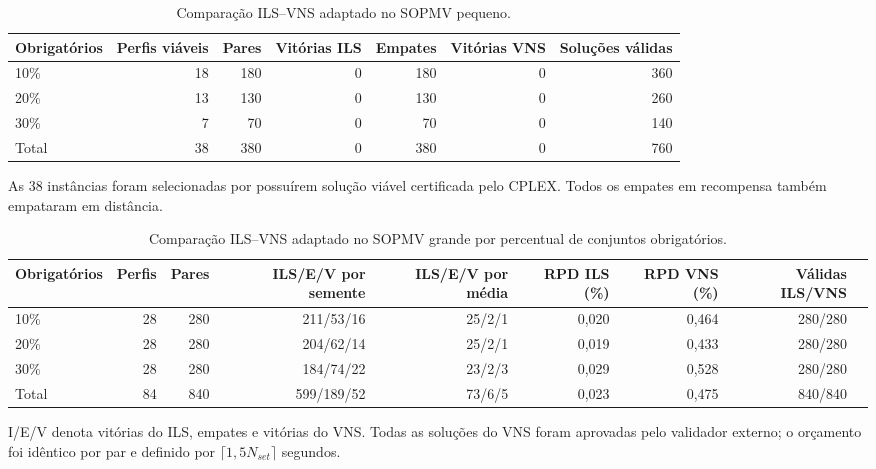 \begin{table}[htbp]
\centering
\caption{Comparação ILS--VNS adaptado no SOPMV pequeno.}
\label{tab:ils-vns-sopmv-small-summary}
\begin{tabular}{lrrrrrr}
\toprule
Obrigatórios & Perfis viáveis & Pares & Vitórias ILS & Empates & Vitórias VNS & Soluções válidas \\
\midrule
10\% & 18 & 180 & 0 & 180 & 0 & 360 \\
20\% & 13 & 130 & 0 & 130 & 0 & 260 \\
30\% & 7 & 70 & 0 & 70 & 0 & 140 \\
\midrule
Total & 38 & 380 & 0 & 380 & 0 & 760 \\
\bottomrule
\end{tabular}
\begin{minipage}{0.93\linewidth}\footnotesize
As 38 instâncias foram selecionadas por possuírem solução viável certificada pelo CPLEX. Todos os empates em recompensa também empataram em distância.
\end{minipage}
\end{table}

\begin{table}[htbp]
\centering
\caption{Comparação ILS--VNS adaptado no SOPMV grande por percentual de conjuntos obrigatórios.}
\label{tab:ils-vns-sopmv-large-summary}
\begin{tabular}{lrrrrrrrr}
\toprule
Obrigatórios & Perfis & Pares & ILS/E/V por semente & ILS/E/V por média & RPD ILS (\%) & RPD VNS (\%) & Válidas ILS/VNS \\
\midrule
10\% & 28 & 280 & 211/53/16 & 25/2/1 & 0{,}020 & 0{,}464 & 280/280 \\
20\% & 28 & 280 & 204/62/14 & 25/2/1 & 0{,}019 & 0{,}433 & 280/280 \\
30\% & 28 & 280 & 184/74/22 & 23/2/3 & 0{,}029 & 0{,}528 & 280/280 \\
\midrule
Total & 84 & 840 & 599/189/52 & 73/6/5 & 0{,}023 & 0{,}475 & 840/840 \\
\bottomrule
\end{tabular}
\begin{minipage}{0.96\linewidth}\footnotesize
I/E/V denota vitórias do ILS, empates e vitórias do VNS. Todas as soluções do VNS foram aprovadas pelo validador externo; o orçamento foi idêntico por par e definido por $\lceil1{,}5N_{set}\rceil$ segundos.
\end{minipage}
\end{table}

